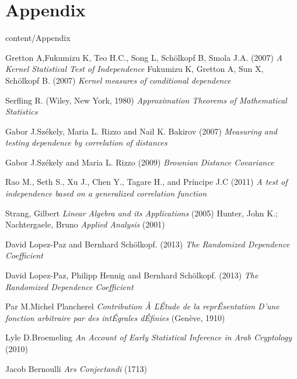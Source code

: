 \documentclass[epsbased,copyright,final,english,printable,covers,extendedindex,firstnumbered,tfg,gnuplot]{tfgtfmthesisuam}
\begin{document}
\chapter{Appendix\label{Apendix}}{content/Appendix}
\begin{thebibliography}{9}
 Gretton A,Fukumizu K, Teo H.C., Song L, Schölkopf B, Smola J.A.
(2007)
\textit{A Kernel Statistical Test of Independence}
 Fukumizu K, Gretton A, Sun X, Schölkopf B. (2007)
\textit{Kernel measures of conditional dependence}
 
 Serfling R.
(Wiley, New York, 1980)
\textit{Approximation Theorems of Mathematical Statistics}

 Gabor J.Székely, Maria L. Rizzo and Nail K. Bakirov
(2007)
\textit{Measuring and testing dependence by correlation of distances}

 Gabor J.Székely and Maria L. Rizzo
(2009)
\textit{Brownian Distance Covariance}

 Rao M., Seth S., Xu J., Chen Y., Tagare H., and Príncipe J.C (2011)
\textit{A test of independence based on a generalized correlation function}

 Strang, Gilbert 
\textit{Linear Algebra and its Applications}
(2005)
 Hunter, John K.; Nachtergaele, Bruno 
\textit{ Applied Analysis}
(2001)

 David Lopez-Paz and Bernhard Schölkopf.
(2013)
\textit{The Randomized Dependence Coefficient}

 David Lopez-Paz, Philipp Hennig and Bernhard Schölkopf.
(2013)
\textit{The Randomized Dependence Coefficient}


 Par M.Michel Plancherel
\textit{Contribution À ĽÉtude de la reprÉsentation D’une fonction arbitraire par des intÉgrales dÉfinies}
(Genève, 1910)

 Lyle D.Broemeling
\textit{An Account of Early Statistical Inference in Arab Cryptology}
(2010)

  Jacob Bernoulli
\textit{Ars Conjectandi}
(1713)

\end{thebibliography}
\end{document}
